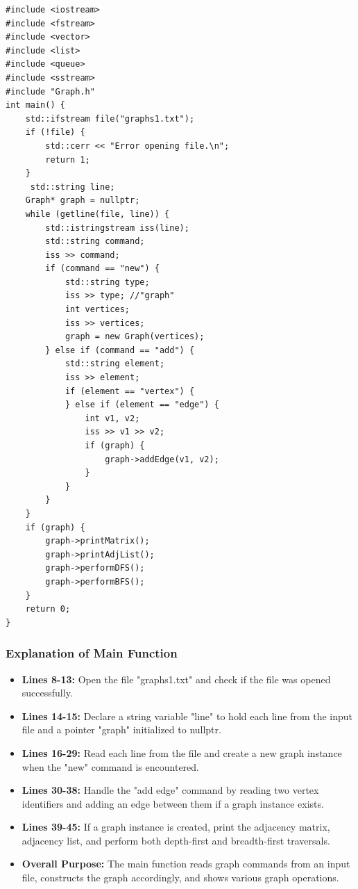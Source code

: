 \documentclass{article}
\begin{document}
\begin{lstlisting}[caption={Main Function for Graph}]
#include <iostream>
#include <fstream>
#include <vector>
#include <list>
#include <queue>
#include <sstream>
#include "Graph.h"
int main() {
    std::ifstream file("graphs1.txt");
    if (!file) {
        std::cerr << "Error opening file.\n";
        return 1;
    }
     std::string line;
    Graph* graph = nullptr;
    while (getline(file, line)) {
        std::istringstream iss(line);
        std::string command;
        iss >> command;
        if (command == "new") {
            std::string type;
            iss >> type; //"graph"
            int vertices; 
            iss >> vertices;
            graph = new Graph(vertices);
        } else if (command == "add") {
            std::string element;
            iss >> element;
            if (element == "vertex") {
            } else if (element == "edge") {
                int v1, v2;
                iss >> v1 >> v2;
                if (graph) {
                    graph->addEdge(v1, v2);
                }
            }
        }
    }
    if (graph) {
        graph->printMatrix();
        graph->printAdjList();
        graph->performDFS();
        graph->performBFS();
    }
    return 0;
}
\end{lstlisting}

\subsubsection{Explanation of Main Function}
\begin{itemize}
    \item \textbf{Lines 8-13:} Open the file "graphs1.txt" and check if the file was opened successfully.
    \item \textbf{Lines 14-15:} Declare a string variable "line" to hold each line from the input file and a pointer "graph" initialized to nullptr.
    \item \textbf{Lines 16-29:} Read each line from the file and create a new graph instance when the "new" command is encountered.
    \item \textbf{Lines 30-38:} Handle the "add edge" command by reading two vertex identifiers and adding an edge between them if a graph instance exists.
    \item \textbf{Lines 39-45:} If a graph instance is created, print the adjacency matrix, adjacency list, and perform both depth-first and breadth-first traversals.
    \item \textbf{Overall Purpose:} The main function reads graph commands from an input file, constructs the graph accordingly, and shows various graph operations.
\end{itemize}
\end{document}

